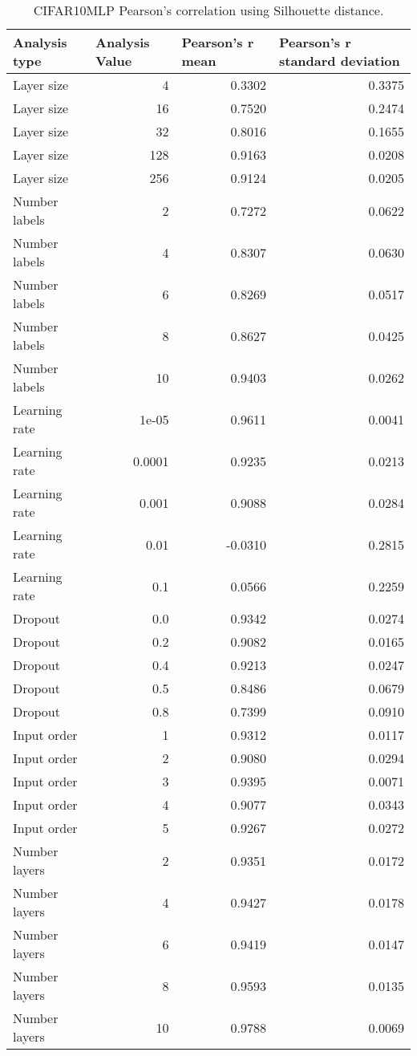 \documentclass{article}
\begin{document}
\begin{table}[H]
\centering
\begin{tabular}{@{}lrrr@{}}
\toprule
Analysis type & \multicolumn{1}{l}{Analysis Value} & \multicolumn{1}{l}{Pearson's r mean} & \multicolumn{1}{l}{Pearson's r standard deviation} \\ \midrule
Layer size & 4 & 0.3302 & 0.3375 \\ 
Layer size & 16 & 0.7520 & 0.2474 \\ 
Layer size & 32 & 0.8016 & 0.1655 \\ 
Layer size & 128 & 0.9163 & 0.0208 \\ 
Layer size & 256 & 0.9124 & 0.0205 \\ 
Number labels & 2 & 0.7272 & 0.0622 \\ 
Number labels & 4 & 0.8307 & 0.0630 \\ 
Number labels & 6 & 0.8269 & 0.0517 \\ 
Number labels & 8 & 0.8627 & 0.0425 \\ 
Number labels & 10 & 0.9403 & 0.0262 \\ 
Learning rate & 1e-05 & 0.9611 & 0.0041 \\ 
Learning rate & 0.0001 & 0.9235 & 0.0213 \\ 
Learning rate & 0.001 & 0.9088 & 0.0284 \\ 
Learning rate & 0.01 & -0.0310 & 0.2815 \\ 
Learning rate & 0.1 & 0.0566 & 0.2259 \\ 
Dropout & 0.0 & 0.9342 & 0.0274 \\ 
Dropout & 0.2 & 0.9082 & 0.0165 \\ 
Dropout & 0.4 & 0.9213 & 0.0247 \\ 
Dropout & 0.5 & 0.8486 & 0.0679 \\ 
Dropout & 0.8 & 0.7399 & 0.0910 \\ 
Input order & 1 & 0.9312 & 0.0117 \\ 
Input order & 2 & 0.9080 & 0.0294 \\ 
Input order & 3 & 0.9395 & 0.0071 \\ 
Input order & 4 & 0.9077 & 0.0343 \\ 
Input order & 5 & 0.9267 & 0.0272 \\ 
Number layers & 2 & 0.9351 & 0.0172 \\ 
Number layers & 4 & 0.9427 & 0.0178 \\ 
Number layers & 6 & 0.9419 & 0.0147 \\ 
Number layers & 8 & 0.9593 & 0.0135 \\ 
Number layers & 10 & 0.9788 & 0.0069 \\ 
\bottomrule
\end{tabular}
\caption{CIFAR10MLP Pearson's correlation using Silhouette distance.}
\end{table}
\end{document}
